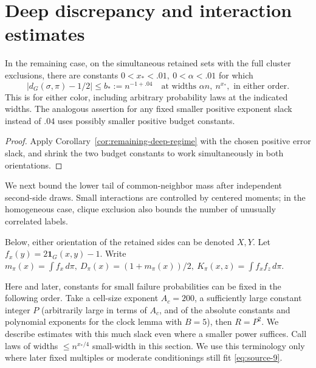 \section{Deep discrepancy and interaction estimates}
\label{sec:the-two-deep-orientations-some-estimates}

\begin{corollary}\label{cor:deep-discrepancy}
In the remaining case, on the simultaneous retained sets with the full cluster exclusions, there are constants \(0<x_*<.01,\ 0<\alpha<.01\) for which
\begin{equation}
 |d_G(\sigma,\pi)-1/2|\le b_*:=n^{-1+.04}
 \quad\text{at widths } \alpha n,\ n^{x_*},\text{ in either order}. \label{eq:source-9}
\end{equation}
This is for either color, including arbitrary probability laws at the indicated widths. The analogous assertion for any fixed smaller positive exponent slack instead of \(.04\) uses possibly smaller positive budget constants.
\end{corollary}

\begin{proof}
Apply Corollary~\ref{cor:remaining-deep-regime} with the chosen positive error slack, and shrink the two budget constants to work simultaneously in both orientations.
\end{proof}

We next bound the lower tail of common-neighbor mass after independent second-side draws. Small interactions are controlled by centered moments; in the homogeneous case, clique exclusion also bounds the number of unusually correlated labels.

Below, either orientation of the retained sides can be denoted \(X,Y\). Let \(f_x(y)=2\mathbf 1_G(x,y)-1\). Write \(m_\pi(x)=\int f_x\,d\pi,\ D_\pi(x)=(1+m_\pi(x))/2,\ K_\pi(x,z)=\int f_x f_z\,d\pi\).

Here and later, constants for small failure probabilities can be fixed in the following order. Take a cell-size exponent \(A_c=200\), a sufficiently large constant integer \(P\) (arbitrarily large in terms of \(A_c\), and of the absolute constants and polynomial exponents for the clock lemma with \(B=5\)), then \(R=P^2\). We describe estimates with this much slack even where a smaller power suffices. Call laws of widths \(\le n^{x_*/4}\) small-width in this section. We use this terminology only where later fixed multiples or moderate conditionings still fit \eqref{eq:source-9}.

